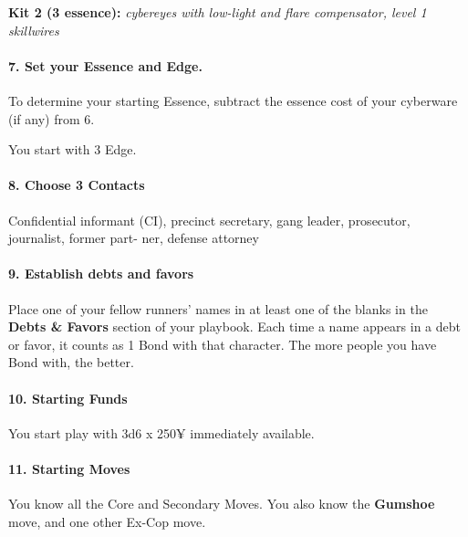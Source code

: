 \begin{multicols}{3}
\textbf{Kit 2 (3 essence):} \textit{cybereyes with low-light
and flare compensator, level 1 skillwires}


\paragraph{7.  Set your Essence and Edge.}

To determine your starting Essence, subtract the
essence cost of your cyberware (if any) from 6.

You start with 3 Edge.

\paragraph{8.  Choose 3 Contacts}

Confidential informant (CI), precinct secretary,
gang leader, prosecutor, journalist, former part-
ner, defense attorney

\paragraph{9.  Establish debts and favors}

Place one of your fellow runners’ names in at
least one of the blanks in the \textbf{Debts \& Favors}
section of your playbook. Each time a name
appears in a debt or favor, it counts as 1 Bond
with that character. The more people you have
Bond with, the better.

\paragraph{10.  Starting Funds}

You start play with 3d6 x 250¥ immediately
available.

\paragraph{11.  Starting Moves}

You know all the Core and Secondary Moves.
You also know the \textbf{Gumshoe} move, and
one other Ex-Cop move.

\end{multicols}

\newpage


